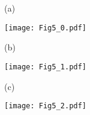 \documentclass[12pt]{article}
\begin{document}
 

\begin{figure}
\begin{minipage}{8.5cm}
\begin{minipage}{0.5cm}
(a) \vspace{4.5cm}
\end{minipage}
\hfill
\begin{minipage}{8cm}
\texttt{[image: Fig5\_0.pdf]}
\end{minipage}
%
\vspace{0.8cm}
\vfill
%
\begin{minipage}{0.5cm}
(b)  \vspace{4.5cm} 
\end{minipage}
\hfill
%
\begin{minipage}{8cm} 
\texttt{[image: Fig5\_1.pdf]}
\end{minipage}
\end{minipage} %
%
\hfill
\hspace{0.15cm} 
\begin{minipage}{8.5cm} 
\begin{minipage}{0.5cm}
(c)  \vspace{10.6cm}
\end{minipage}
\hfill
%
\begin{minipage}{8cm} 
\texttt{[image: Fig5\_2.pdf]}
\end{minipage}
\end{minipage}
\end{figure}
\end{document}
